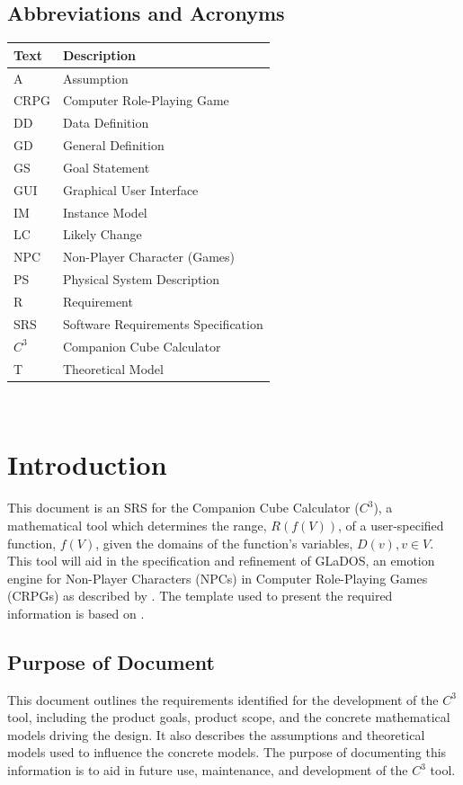 \documentclass[12pt]{article}
\newcommand{\progname}{Companion Cube Calculator} %
\newcommand{\prognameAbbrv}{$C^{3}$}
\begin{document}
\subsection{Abbreviations and Acronyms}

\renewcommand{\arraystretch}{1.2}
\begin{tabular}{l l} 
  \toprule		
  \textbf{Text} & \textbf{Description}\\
  \midrule 
  A & Assumption\\
  CRPG & Computer Role-Playing Game\\
  DD & Data Definition\\
  GD & General Definition\\
  GS & Goal Statement\\
  GUI & Graphical User Interface\\
  IM & Instance Model\\
  LC & Likely Change\\
  NPC & Non-Player Character (Games)\\
  PS & Physical System Description\\
  R & Requirement\\
  SRS & Software Requirements Specification\\
  \prognameAbbrv{} & \progname{}\\
  T & Theoretical Model\\
  \bottomrule
\end{tabular}

\newpage

\tableofcontents

~\newpage


\section{Introduction}
\label{intro}
This document is an SRS for the \progname{} (\prognameAbbrv{}), a mathematical 
tool which determines the range, $R(f(V))$, of a user-specified function, 
$f(V)$, given the domains of the function's variables, $D(v), v \in V$. This 
tool will aid in the specification and refinement of GLaDOS, an emotion engine 
for Non-Player Characters (NPCs) in Computer Role-Playing Games (CRPGs) as 
described by \citet{glados}. The template used to present the required 
information is based on \citet{SmithAndLai2005, SmithEtAl2007}.

\subsection{Purpose of Document}
This document outlines the requirements identified for the development of the 
\prognameAbbrv{} tool, including the product goals, product scope, and the 
concrete mathematical models driving the design. It also describes the 
assumptions and theoretical models used to influence the concrete models. The 
purpose of documenting this information is to aid in future use, maintenance, 
and development of the \prognameAbbrv{} tool.
\end{document}
